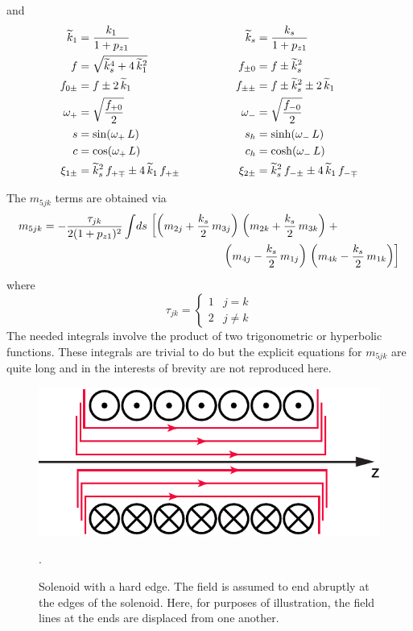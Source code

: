 and
\begin{alignat}{2}
  \widetilde k_1        &= \frac{k_1}{1 + p_{z1}} & \qquad \qquad 
  \widetilde k_s          &= \frac{k_s}{1 + p_{z1}} \nonumber \\
  f            &= \sqrt{\widetilde k_s^4 + 4 \, \widetilde k_1^2} & \qquad \qquad
  f_{\pm0}     &= f \pm \widetilde k_s^2 \nonumber \\
  f_{0\pm}     &= f \pm 2 \, \widetilde k_1 & \qquad \qquad
  f_{\pm\pm}   &= f \pm \widetilde k_s^2 \pm 2 \, \widetilde k_1 \nonumber \\
  \omega_+        &= \sqrt{\frac{f_{+0}}{2}} & \qquad \qquad
  \omega_-        &= \sqrt{\frac{f_{-0}}{2}} \\
  s            &= \sin (\omega_+ \, L) & \qquad \qquad
  s_h          &= \sinh (\omega_- \, L) \nonumber \\
  c            &= \cos (\omega_+ \, L) & \qquad \qquad
  c_h          &= \cosh (\omega_- \, L) \nonumber \\
  \xi_{1\pm} &= \widetilde k_s^2 \, f_{+\mp} \pm 4 \, \widetilde k_1 \, f_{+\pm} & \qquad \qquad
  \xi_{2\pm} &= \widetilde k_s^2 \, f_{-\pm} \pm 4 \, \widetilde k_1 \, f_{-\mp} \nonumber
\end{alignat}

The $m_{5jk}$ terms are obtained via 
\begin{align}
  m_{5jk} = - \frac{\tau_{jk}}{2 (1 + p_{z1})^2} \int \! ds \, 
  & \left[ 
    \left( m_{2j} + \frac{k_s}{2} \, m_{3j} \right) \, 
    \left( m_{2k} + \frac{k_s}{2} \, m_{3k} \right)   
  \right. + \\
  & \hspace*{15ex} \left.
    \left( m_{4j} - \frac{k_s}{2} \, m_{1j} \right) \, 
    \left( m_{4k} - \frac{k_s}{2} \, m_{1k} \right) 
  \right] \nonumber
\end{align}
where
\begin{equation}
  \tau_{jk} = 
  \begin{cases}
    1 & j = k \\
    2 & j \ne k 
  \end{cases}
\end{equation}
The needed integrals involve the product of two trigonometric or
hyperbolic functions. These integrals are trivial to do but the
explicit equations for $m_{5jk}$ are quite long and in the interests of
brevity are not reproduced here.


\begin{figure}[tb]
  \centering
  \includegraphics[width=5in]{solenoid.pdf}
  \caption[Solenoid with a hard edge.]
  {
Solenoid with a hard edge. The field is assumed to end abruptly at the edges of the solenoid. Here,
for purposes of illustration, the field lines at the ends are displaced from one another.
  }
  \label{f:solenoid}.
\end{figure}

